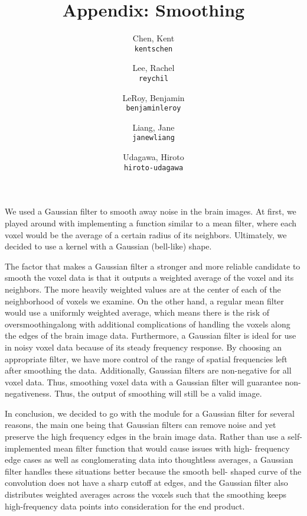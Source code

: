 \documentclass[11pt]{article}
\title{Appendix: Smoothing}
\author{
  Chen, Kent\\
  \texttt{kentschen}
  \and
  Lee, Rachel\\
  \texttt{reychil}
  \and
  LeRoy, Benjamin\\
  \texttt{benjaminleroy}
  \and
  Liang, Jane\\
  \texttt{janewliang}
  \and
  Udagawa, Hiroto\\
  \texttt{hiroto-udagawa}
}
\begin{document}
\maketitle

\par \indent We used a Gaussian filter to smooth away noise in the brain 
images. At first, we played around with implementing a function similar 
to a mean filter, where each voxel would be the average of a certain radius 
of its neighbors. Ultimately, we decided to use a kernel with a Gaussian 
(bell-like) shape. 
\par The factor that makes a Gaussian filter a stronger and more 
reliable candidate to smooth the voxel data is that it outputs a weighted 
average of the voxel and its neighbors. The more heavily weighted values are 
at the center of each of the neighborhood of voxels we examine. On the other 
hand, a regular mean filter would use a uniformly weighted average, which means
 there is the risk of oversmoothingalong with additional complications of 
handling the voxels along the edges of the brain image data. Furthermore, a Gaussian filter is ideal for use in noisy voxel data 
because of its steady frequency response. By choosing an appropriate filter, 
we have more control of the range of spatial frequencies left after smoothing 
the data. Additionally, Gaussian filters are non-negative for all voxel data. 
Thus, smoothing voxel data with a Gaussian filter will guarantee non-
negativeness. Thus, the output of smoothing will still be a valid image.
\par In conclusion, we decided to go with the module for a Gaussian filter for 
several reasons, the main one being that Gaussian filters can remove noise and 
yet preserve the high frequency edges in the brain image data. Rather than use 
a self-implemented mean filter function that would cause issues with high-
frequency edge cases as well as conglomerating data into thoughtless averages, 
a Gaussian filter handles these situations better because the smooth bell-
shaped curve of the convolution does not have a sharp cutoff at edges, and the 
Gaussian filter also distributes weighted averages across the voxels such that 
the smoothing keeps high-frequency data points into consideration for the end 
product.

\end{document}
